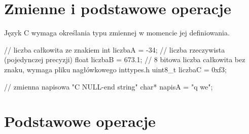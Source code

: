 % 
% 
% 
% 

\section{Zmienne i podstawowe operacje}

Język C wymaga określania typu zmiennej w momencie jej definiowania.

\begin{CodeFrame*}[c]{}
// liczba całkowita ze znakiem
int     liczbaA = -34;
// liczba rzeczywista (pojedynczej precyzji)
float   liczbaB = 673.1;
// 8 bitowa liczba całkowita bez znaku, wymaga pliku nagłówkowego inttypes.h
uint8_t liczbaC = 0xf3;

// zmienna napisowa "C NULL-end string"
char* napisA = "q we";
\end{CodeFrame*}

\section{Podstawowe operacje}

